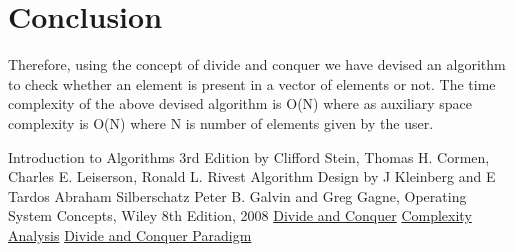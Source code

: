 \documentclass[conference]{IEEEtran}
\begin{document}
\section{Conclusion}
Therefore, using the concept of divide and conquer we have devised an algorithm to check whether an element is present in a vector of elements or not. The time complexity of the above devised algorithm is O(N) where as auxiliary space complexity is O(N) where N is number of elements given by the user.\\
\begin{thebibliography}{00}
Introduction to Algorithms 3rd Edition by Clifford Stein, Thomas H. Cormen, Charles E. Leiserson, Ronald L. Rivest
 Algorithm Design by J Kleinberg and E Tardos
 Abraham Silberschatz Peter B. Galvin and Greg Gagne, Operating System Concepts, Wiley 8th Edition, 2008
 \href{https://en.wikipedia.org/wiki/Divide-and-conquer_algorithm}{Divide and Conquer}
\href{https://stackoverflow.com/questions/11032015/how-to-find-time-complexity-of-an-algorithm}{Complexity Analysis}
\href{http://www.csun.edu/~mam78887/MAMANLEY.pdf}{Divide and Conquer Paradigm}
\end{thebibliography}
\end{document}
